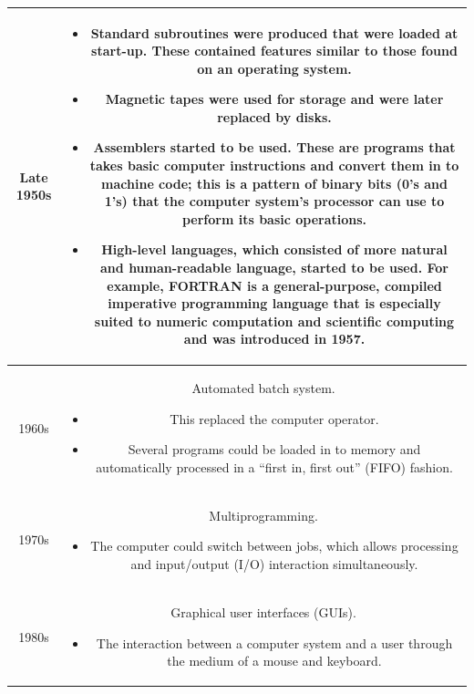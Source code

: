 \documentclass[a4paper]{systems-software}
\begin{document}
\begin{longtable}{|c|c|}
	\hline
	Late 1950s &
	\begin{minipage}[t]{0.8\textwidth}
    	\begin{itemize}
		    \item Standard subroutines were produced that were loaded at start-up. These contained features similar to those found on an operating system.
	  		\item Magnetic tapes were used for storage and were later replaced by disks.
	  		\item Assemblers started to be used. These are programs that takes basic computer instructions and convert them in to machine code; this is a pattern of binary bits (0’s and 1’s) that the computer system's processor can use to perform its basic operations.
	  		\item High-level languages, which consisted of more natural and human-readable language, started to be used. For example, FORTRAN is a general-purpose, compiled imperative programming language that is especially suited to numeric computation and scientific computing and was introduced in 1957.
    	\end{itemize}
  	\end{minipage}
	\\ \hline
	1960s &
	\begin{minipage}[t]{0.8\textwidth}
	  	Automated batch system.
	    \begin{itemize}
		    \item This replaced the computer operator.
		    \item Several programs could be loaded in to memory and automatically processed in a “first in, first out” (FIFO) fashion.
    	\end{itemize}
	\end{minipage}
	\\ \hline
	1970s &
	\begin{minipage}[t]{0.8\textwidth}
	  	Multiprogramming.
	    \begin{itemize}
		    \item The computer could switch between jobs, which allows processing and input/output (I/O) interaction simultaneously.
    	\end{itemize}
	\end{minipage}
	\\ \hline
	1980s &
	\begin{minipage}[t]{0.8\textwidth}
	  	Graphical user interfaces (GUIs).
	    \begin{itemize}
		    \item The interaction between a computer system and a user through the medium of a mouse and keyboard.
    	\end{itemize}
	\end{minipage}
	\\ \hline
\end{longtable}
\end{document}
